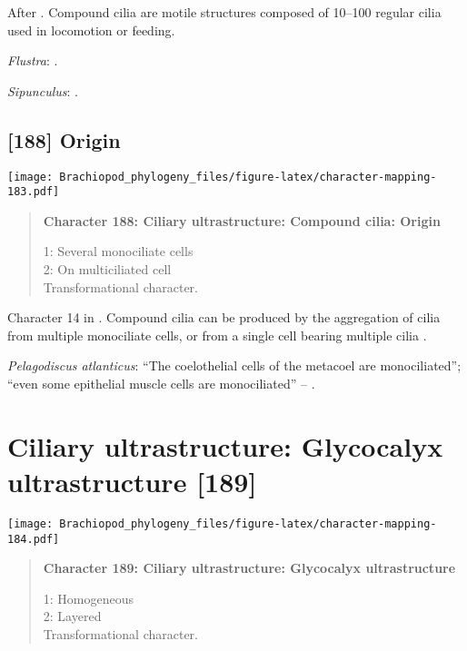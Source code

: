 \documentclass[openany]{book}
\theoremstyle{definition}
\theoremstyle{definition}
\theoremstyle{definition}
\theoremstyle{remark}
\begin{document}
After \citet{Lundin2009}. Compound cilia are motile structures composed
of 10--100 regular cilia used in locomotion or feeding.

\hypertarget{Flustra-coding-187}{}
\emph{Flustra}: \citet{Reed1982}.

\hypertarget{Sipunculus-coding-187}{}
\emph{Sipunculus}: \citet{Nielsen1987}.

\subsection*{{[}188{]} Origin}\label{origin-1}

\texttt{[image: Brachiopod\_phylogeny\_files/figure-latex/character-mapping-183.pdf]}

\begin{quote}
\textbf{Character 188: Ciliary ultrastructure: Compound cilia: Origin}

1: Several monociliate cells\\
2: On multiciliated cell\\
Transformational character.
\end{quote}

Character 14 in \citet{Glenner2004}. Compound cilia can be produced by
the aggregation of cilia from multiple monociliate cells, or from a
single cell bearing multiple cilia \citep{Nielsen1987}.

\hypertarget{Pelagodiscus_atlanticus-coding-188}{}
\emph{Pelagodiscus atlanticus}: ``The coelothelial cells of the metacoel
are monociliated''; ``even some epithelial muscle cells are
monociliated'' -- \citet{Luter1995}.

\section{Ciliary ultrastructure: Glycocalyx ultrastructure
{[}189{]}}\label{ciliary-ultrastructure-glycocalyx-ultrastructure-189}

\texttt{[image: Brachiopod\_phylogeny\_files/figure-latex/character-mapping-184.pdf]}

\begin{quote}
\textbf{Character 189: Ciliary ultrastructure: Glycocalyx
ultrastructure}

1: Homogeneous\\
2: Layered\\
Transformational character.
\end{quote}
\end{document}
